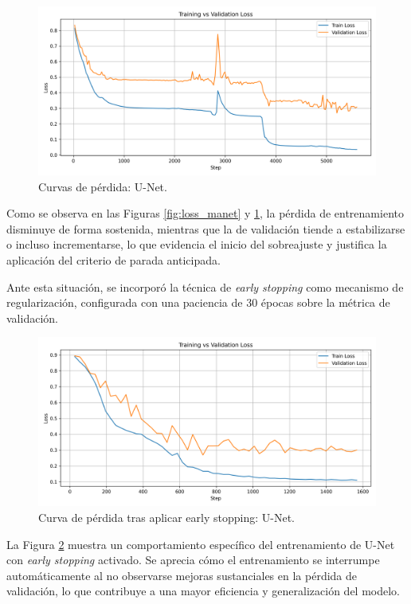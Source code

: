 \begin{figure}[h]
    \centering
    \includegraphics[width= \textwidth]{img/training_vs_validation_loss_unet.png}
    \caption{Curvas de pérdida: U-Net.}
    \label{fig:loss_unet}
\end{figure}

Como se observa en las Figuras \ref{fig:loss_manet} y \ref{fig:loss_unet}, la pérdida de entrenamiento disminuye de forma sostenida, mientras que la de validación tiende a estabilizarse o incluso incrementarse, lo que evidencia el inicio del sobreajuste y justifica la aplicación del criterio de parada anticipada.

Ante esta situación, se incorporó la técnica de \textit{early stopping} como mecanismo de regularización, configurada con una paciencia de 30 épocas sobre la métrica de validación.

\begin{figure}[h]
    \centering
    \includegraphics[width=1.1\textwidth]{img/training_vs_validation_loss.png}
    \caption{Curva de pérdida tras aplicar early stopping: U-Net.}
    \label{fig:loss_unet_earlystopping}
\end{figure}

La Figura \ref{fig:loss_unet_earlystopping} muestra un comportamiento específico del entrenamiento de U-Net con \textit{early stopping} activado. Se aprecia cómo el entrenamiento se interrumpe automáticamente al no observarse mejoras sustanciales en la pérdida de validación, lo que contribuye a una mayor eficiencia y generalización del modelo.


